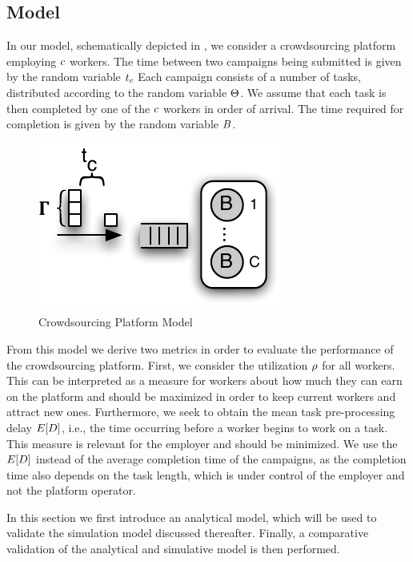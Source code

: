 \subsection{Model}\label{sec:cloud:crowdsourcing:model}

In our model, schematically depicted in , we consider a crowdsourcing  platform employing \(c\) workers.
The time between two campaigns being submitted is given by the random variable \(t_c\)
Each campaign consists of a number of tasks, distributed according to the random variable \(\Theta\).
We assume that each task is then completed by one of the \(c\) workers in order of arrival.
The time required for completion is given by the random variable \(B\).

\begin{figure}
  \centering
  \includegraphics{cloud/crowdsourcing/model/figures/model}
  \caption{Crowdsourcing Platform Model}
  \label{fig:sec:cloud:crowdsourcing:model:model}
\end{figure}

From this model we derive two metrics in order to evaluate the performance of the crowdsourcing platform.
First, we consider the utilization \(\rho\) for all workers.
This can be interpreted as a measure for workers about how much they can earn on the platform and should be maximized in order to keep current workers and attract new ones. 
Furthermore, we seek to obtain the mean task pre-processing delay \(E[D]\), i.e., the time occurring before a worker begins to work on a task.
This measure is relevant for the employer and should be minimized.
We use the \(E[D]\) instead of the average completion time of the campaigns, as the completion time also depends on the task length, which is under control of the employer and not the platform operator.

In this section we first introduce an analytical model, which will be used to validate the simulation model discussed thereafter.
Finally, a comparative validation of the analytical and simulative model is then performed.

